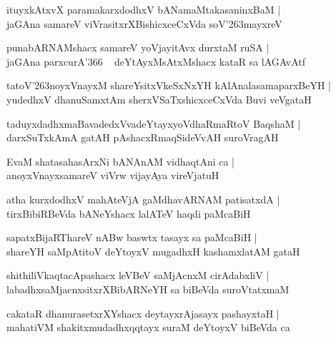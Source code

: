 \documentclass[twoside,12pt,openright]{book}
\def\S{\char'263}
\newcounter{shloka}[chapter]
\begin{document}
\begin{shloka}%
ituyxkAtxvX paramakarxdodhxV bANamaMtakasaninxBaM |\\
jaGAna samareV viVrasitxrXBishicxceCxVda soV\S mayxreV 
\end{shloka}

\begin{shloka}%
punabARNAMshacx samareV yoVjayitAvx durxtaM ruSA |\\
jaGAna parxcurA\char'366 ~ deYtAyxMsAtxMshacx kataR sa lAGAvAtf 
\end{shloka}

\begin{shloka}%
tatoV\S noyxVnayxM shareYsitxVkeSxNxYH kAlAnalasamaparxBeYH |\\
yudedhxV dhanuSamxtAm sherxVSaTxshicxceCxVda Buvi veVgataH 
\end{shloka}

\begin{shloka}%
taduyxdadhxmaBavadedxVvadeYtayxyoVdhaRmaRtoV BaqshaM |\\
darxSuTxkAmA gatAH pAshacxRmaqSideVvAH suroVragAH 
\end{shloka}

\begin{shloka}%
EvaM shatasahasArxNi bANAnAM vidhaqtAni ca |\\
anoyxVnayxsamareV viVrw vijayAya vireVjatuH 
\end{shloka}

\begin{shloka}%
atha kurxdodhxV mahAteVjA gaMdhavARNAM patisatxdA |\\
tirxBibiRBeVda bANeYshacx lalATeV haqdi paMcaBiH 
\end{shloka}

\begin{shloka}%
sapatxBijaRThareV nABw baswtx tasayx sa paMcaBiH |\\
shareYH saMpAtitoV deYtoyxV mugadhxH kashamxlatAM gataH 
\end{shloka}

\begin{shloka}%
shithiliVkaqtacApashacx leVBeV saMjAcnxM cirAdabxliV |\\
labadhxsaMjacnxsitxrXBibARNeYH sa biBeVda suroVtatxmaM 
\end{shloka}

\begin{shloka}%
cakataR dhanurasetxrXYshacx deytayxrAjasayx pashayxtaH |\\
mahatiVM shakitxmudadhxqqtayx suraM deYtoyxV biBeVda ca
\end{shloka}
\end{document}
